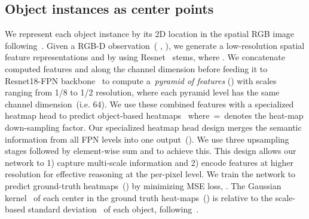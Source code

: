 \documentclass[letter, 10pt, conference]{ieeeconf}
\begin{document}
\subsection{Object instances as center points}
\label{backbone}
We represent each object instance by its 2D location in the spatial RGB image following~\cite{zhou2019objects, duan2019centernet}. Given a RGB-D observation~(  ,   ), we generate a low-resolution spatial feature representations    and    by using Resnet~\cite{he2016deep} stems, where . We concatenate computed features  and  along the channel dimension before feeding it to Resnet18-FPN backbone~\cite{kirillov2019panoptic} to compute a~\textit{pyramid of features} () with scales ranging from 1/8 to 1/2 resolution, where each pyramid
level has the same channel dimension~(i.e. 64). We use these combined features with a specialized heatmap head to predict object-based heatmaps~ where \,=\, denotes the heat-map down-sampling factor. Our specialized heatmap head design merges the semantic information from all FPN levels into one output~(). We use three upsampling stages followed by element-wise sum and  to achieve this. This design allows our network to 1) capture multi-scale information and 2) encode features at higher resolution for effective reasoning at the per-pixel level. We train the network to predict ground-truth heatmaps~() by minimizing MSE loss, . The Gaussian kernel~ of each center in the ground truth heat-maps~() is relative to the scale-based standard deviation~ of each object, following~\cite{laskey2021simnet, zhou2019objects, duan2019centernet, law2018cornernet}. 
\end{document}
